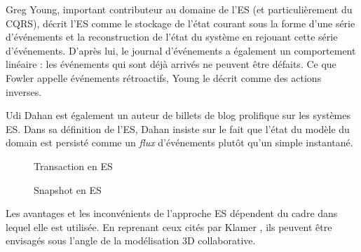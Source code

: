Greg Young, important contributeur au domaine de l'\gls{ES} (et particulièrement du \gls{CQRS}), 
décrit l'\gls{ES} comme \og le stockage de l'état courant sous la forme 
d'une série d'événements et la reconstruction de l'état du système en rejouant 
cette série d'événements\fg{}. D'après lui, le journal d'événements a également 
un comportement linéaire : les événements qui sont déjà arrivés ne peuvent 
être défaits. Ce que Fowler appelle événements rétroactifs, Young le décrit 
comme des actions inverses.

Udi Dahan est également un auteur de billets de blog 
prolifique sur les systèmes \gls{ES}. Dans sa définition de l'\gls{ES}, Dahan 
insiste sur le fait que \og l'état du modèle du domain est persisté comme un 
\textit{flux} d'événements plutôt qu'un simple instantané\fg{}.


%
	\begin{figure}[!h]
		
		\centering
		\noindent
	
		\caption{Transaction en \gls{ES}}
		\label{fig:es-transaction}
	\end{figure}

	
	\begin{figure}[t]
		\centering
		
		\caption{Snapshot en \gls{ES}}
	\end{figure}

Les avantages et les inconvénients de l'approche \gls{ES} dépendent du
cadre dans lequel elle est utilisée. En reprenant ceux cités par Klamer 
\cite{Klamer2013a}, ils peuvent être envisagés sous l'angle de la modélisation 
\gls{3D} 
collaborative.

